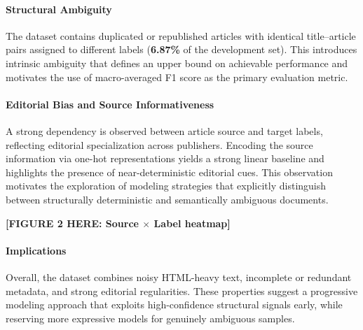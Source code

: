 \paragraph{Structural Ambiguity}
The dataset contains duplicated or republished articles
with identical title--article pairs assigned to different labels
(\textbf{6.87\%} of the development set). This introduces intrinsic ambiguity that defines an upper bound on achievable performance and motivates the use of macro-averaged F1 score as the primary evaluation metric.

\paragraph{Editorial Bias and Source Informativeness}
A strong dependency is observed between article source and target labels, reflecting editorial specialization across publishers. Encoding the source information via one-hot representations yields a strong linear baseline and highlights the presence of near-deterministic editorial cues. This observation motivates the exploration of modeling strategies that explicitly distinguish between structurally deterministic and semantically ambiguous documents.

\textbf{[FIGURE 2 HERE: Source $\times$ Label heatmap]}

\paragraph{Implications}
Overall, the dataset combines noisy HTML-heavy text, incomplete or redundant metadata, and strong editorial regularities. These properties suggest a progressive modeling approach that exploits high-confidence structural signals early, while reserving more expressive models for genuinely ambiguous samples.
